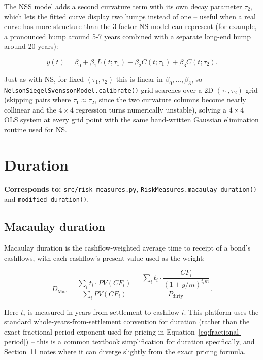 \documentclass[11pt]{article}
\begin{document}
The NSS model adds a second curvature term with its own decay parameter $\tau_2$, which lets
the fitted curve display two humps instead of one -- useful when a real curve has more
structure than the 3-factor NS model can represent (for example, a pronounced hump around 5-7
years combined with a separate long-end hump around 20 years):

\begin{equation}
  y(t) = \beta_0 + \beta_1 L(t;\tau_1) + \beta_2 C(t;\tau_1) + \beta_3 C(t;\tau_2).
  \label{eq:nss}
\end{equation}

Just as with NS, for fixed $(\tau_1, \tau_2)$ this is linear in $\beta_0,\dots,\beta_3$, so
\texttt{NelsonSiegelSvenssonModel.calibrate()} grid-searches over a 2D $(\tau_1, \tau_2)$ grid
(skipping pairs where $\tau_1 \approx \tau_2$, since the two curvature columns become nearly
collinear and the $4\times 4$ regression turns numerically unstable), solving a $4\times 4$ OLS
system at every grid point with the same hand-written Gaussian elimination routine used for NS.

\section{Duration}
\label{sec:duration}

\textbf{Corresponds to:} \texttt{src/risk\_measures.py}, \texttt{RiskMeasures.macaulay\_duration()}
and \texttt{modified\_duration()}.

\subsection{Macaulay duration}

Macaulay duration is the cashflow-weighted average time to receipt of a bond's cashflows, with
each cashflow's present value used as the weight:

\begin{equation}
  D_{\text{Mac}} = \frac{\sum_{i} t_i \cdot PV(CF_i)}{\sum_i PV(CF_i)}
                 = \frac{\sum_i t_i \cdot \dfrac{CF_i}{(1+y/m)^{t_i m}}}{P_{\text{dirty}}}.
  \label{eq:macaulay}
\end{equation}

Here $t_i$ is measured in years from settlement to cashflow $i$. This platform uses the
standard whole-years-from-settlement convention for duration (rather than the exact
fractional-period exponent used for pricing in Equation~\ref{eq:fractional-period}) --
this is a common textbook simplification for duration specifically, and Section~11 notes
where it can diverge slightly from the exact pricing formula.
\end{document}
